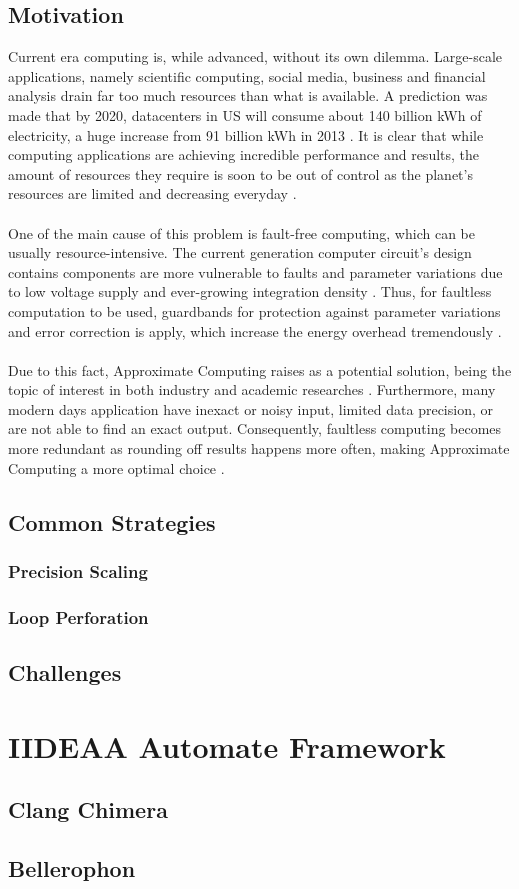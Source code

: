 \subsection{Motivation}

Current era computing is, while advanced, without its own dilemma. Large-scale applications, namely scientific computing, social media, business and financial analysis drain far too much resources than what is available. A prediction was made that by 2020, datacenters in US will consume about 140 billion kWh of electricity, a huge increase from 91 billion kWh in 2013 \cite{NRDC}. It is clear that while computing applications are achieving incredible performance and results, the amount of resources they require is soon to be out of control as the planet's resources are limited and decreasing everyday \cite{AxCSurvey}. \\
~\\
One of the main cause of this problem is fault-free computing, which can be usually resource-intensive. The current generation computer circuit's design contains components are more vulnerable to faults and parameter variations due to low voltage supply and ever-growing integration density \cite{1322441}. Thus, for faultless computation to be used, guardbands for protection against parameter variations and error correction is apply, which increase the energy overhead tremendously \cite{7348659}. \\
~\\
Due to this fact, Approximate Computing raises as a potential solution, being the topic of interest in both industry and academic researches \cite{7348659}. Furthermore, many modern days application have inexact or noisy input, limited data precision, or are not able to find an exact output. Consequently, faultless computing becomes more redundant as rounding off results happens more often, making Approximate Computing a more optimal choice \cite{AxCSurvey}. \\

\subsection{Common Strategies}

\subsubsection{Precision Scaling}

\subsubsection{Loop Perforation}

\subsection{Challenges}

\section{IIDEAA Automate Framework} 

\subsection{Clang Chimera}

\subsection{Bellerophon}